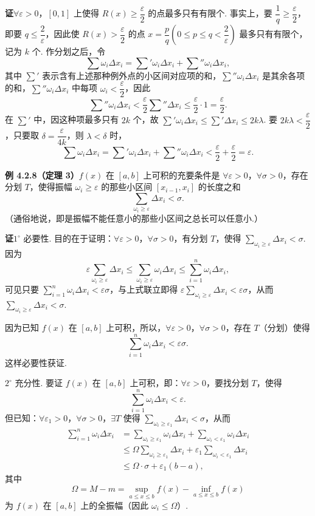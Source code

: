 \documentclass[UTF8, 12pt, fontset=fandol, oneside]{ctexart}
\begin{document}
\noindent\textbf{证}\quad $\forall\varepsilon>0$，$[0,1]$ 上使得 $R(x)\ge\dfrac{\varepsilon}{2}$ 的点最多只有有限个. 事实上，要 $\dfrac1q\ge\dfrac{\varepsilon}{2}$，即要 $q\le\dfrac2\varepsilon$，因此使 $R(x)>\dfrac{\varepsilon}{2}$ 的点 $x=\dfrac pq\left(0\le p\le q<\dfrac2\varepsilon\right)$ 最多只有有限个，记为 $k$ 个. 作分划之后，令
\[
\sum\omega_i\Delta x_i=\sum'\omega_i\Delta x_i+\sum''\omega_i\Delta x_i,
\]
其中 $\sum'$ 表示含有上述那种例外点的小区间对应项的和，$\sum''\omega_i\Delta x_i$ 是其余各项的和，$\sum''\omega_i\Delta x_i$ 中每项 $\omega_i<\dfrac{\varepsilon}{2}$，因此
\[
\sum''\omega_i\Delta x_i<\frac{\varepsilon}{2}\sum''\Delta x_i\le\frac{\varepsilon}{2}\cdot1=\frac{\varepsilon}{2}.
\]
在 $\sum'$ 中，因这种项最多只有 $2k$ 个，故 $\sum'\omega_i\Delta x_i\le\sum'\Delta x_i\le2k\lambda$. 要 $2k\lambda<\dfrac{\varepsilon}{2}$，只要取 $\delta=\dfrac{\varepsilon}{4k}$，则 $\lambda<\delta$ 时，
\[
\sum\omega_i\Delta x_i=\sum'\omega_i\Delta x_i+\sum''\omega_i\Delta x_i<\frac{\varepsilon}{2}+\frac{\varepsilon}{2}=\varepsilon.
\]

\noindent\textbf{例 4.2.8（定理 3）}\quad $f(x)$ 在 $[a,b]$ 上可积的充要条件是 $\forall\varepsilon>0$，$\forall\sigma>0$，存在分划 $T$，使得振幅 $\omega_i\ge\varepsilon$ 的那些小区间 $[x_{i-1},x_i]$ 的长度之和
\[
\sum_{\omega_i\ge\varepsilon}\Delta x_i<\sigma.
\]
（通俗地说，即是振幅不能任意小的那些小区间之总长可以任意小.）

\noindent\textbf{证}\quad $1^\circ$ 必要性. 目的在于证明：$\forall\varepsilon>0$，$\forall\sigma>0$，有分划 $T$，使得 $\sum_{\omega_i\ge\varepsilon}\Delta x_i<\sigma$. 因为
\[
\varepsilon\sum_{\omega_i\ge\varepsilon}\Delta x_i
\le\sum_{\omega_i\ge\varepsilon}\omega_i\Delta x_i
\le\sum_{i=1}^n\omega_i\Delta x_i,
\]
可见只要 $\sum_{i=1}^n\omega_i\Delta x_i<\varepsilon\sigma$，与上式联立即得 $\varepsilon\sum_{\omega_i\ge\varepsilon}\Delta x_i<\varepsilon\sigma$，从而 $\sum_{\omega_i\ge\varepsilon}\Delta x_i<\sigma$.

因为已知 $f(x)$ 在 $[a,b]$ 上可积，所以，$\forall\varepsilon>0$，$\forall\sigma>0$，存在 $T$（分划）使得
\[
\sum_{i=1}^n\omega_i\Delta x_i<\varepsilon\sigma.
\]
这样必要性获证.

$2^\circ$ 充分性. 要证 $f(x)$ 在 $[a,b]$ 上可积，即：$\forall\varepsilon>0$，要找分划 $T$，使得
\[
\sum_{i=1}^n\omega_i\Delta x_i<\varepsilon.
\tag{1}
\]
但已知：$\forall\varepsilon_1>0$，$\forall\sigma>0$，$\exists T$ 使得 $\sum_{\omega_i\ge\varepsilon_1}\Delta x_i<\sigma$，从而
\[
\begin{aligned}
\sum_{i=1}^n\omega_i\Delta x_i
&=\sum_{\omega_i\ge\varepsilon_1}\omega_i\Delta x_i
+\sum_{\omega_i<\varepsilon_1}\omega_i\Delta x_i\\
&\le \Omega\sum_{\omega_i\ge\varepsilon_1}\Delta x_i
+\varepsilon_1\sum_{\omega_i<\varepsilon_1}\Delta x_i\\
&\le\Omega\cdot\sigma+\varepsilon_1(b-a),
\end{aligned}
\tag{2}
\]
其中
\[
\Omega=M-m=\sup_{a\le x\le b}f(x)-\inf_{a\le x\le b}f(x)
\]
为 $f(x)$ 在 $[a,b]$ 上的全振幅（因此 $\omega_i\le\Omega$）.
\end{document}
